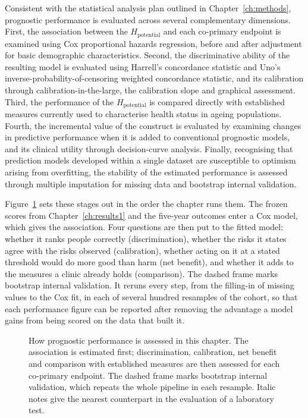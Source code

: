 Consistent with the statistical analysis plan outlined in Chapter~\ref{ch:methods}, prognostic performance is evaluated across several complementary dimensions. First, the association between the $H_{\text{potential}}$ and each co-primary endpoint is examined using Cox proportional hazards \citep{cox_1972} regression, before and after adjustment for basic demographic characteristics. Second, the discriminative ability of the resulting model is evaluated using Harrell's concordance statistic and Uno's inverse-probability-of-censoring weighted concordance statistic, and its calibration through calibration-in-the-large, the calibration slope and graphical assessment. Third, the performance of the $H_{\text{potential}}$ is compared directly with established measures currently used to characterise health status in ageing populations. Fourth, the incremental value of the construct is evaluated by examining changes in predictive performance when it is added to conventional prognostic models, and its clinical utility through decision-curve analysis. Finally, recognising that prediction models developed within a single dataset are susceptible to optimism arising from overfitting, the stability of the estimated performance is assessed through multiple imputation for missing data and bootstrap internal validation.

Figure~\ref{fig:prog-validation} sets these stages out in the order the chapter runs them. The frozen scores from Chapter~\ref{ch:results1} and the five-year outcomes enter a Cox model, which gives the association. Four questions are then put to the fitted model: whether it ranks people correctly (discrimination), whether the risks it states agree with the risks observed (calibration), whether acting on it at a stated threshold would do more good than harm (net benefit), and whether it adds to the measures a clinic already holds (comparison). The dashed frame marks bootstrap internal validation. It reruns every step, from the filling-in of missing values to the Cox fit, in each of several hundred resamples of the cohort, so that each performance figure can be reported after removing the advantage a model gains from being scored on the data that built it.

\begin{figure}[htbp]
\centering

\captionsetup{justification=justified, width=\linewidth}
\caption{How prognostic performance is assessed in this chapter. The association is estimated first; discrimination, calibration, net benefit and comparison with established measures are then assessed for each co-primary endpoint. The dashed frame marks bootstrap internal validation, which repeats the whole pipeline in each resample. Italic notes give the nearest counterpart in the evaluation of a laboratory test.}
\label{fig:prog-validation}
\end{figure}

